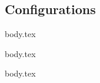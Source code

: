 \subsection{Configurations}

\ifdefined\gitLog
{body.tex}
\fi

\ifdefined\gitApplyGitIgnore
{body.tex}
\fi

\ifdefined\gitMultipleUsers
{body.tex}
\fi